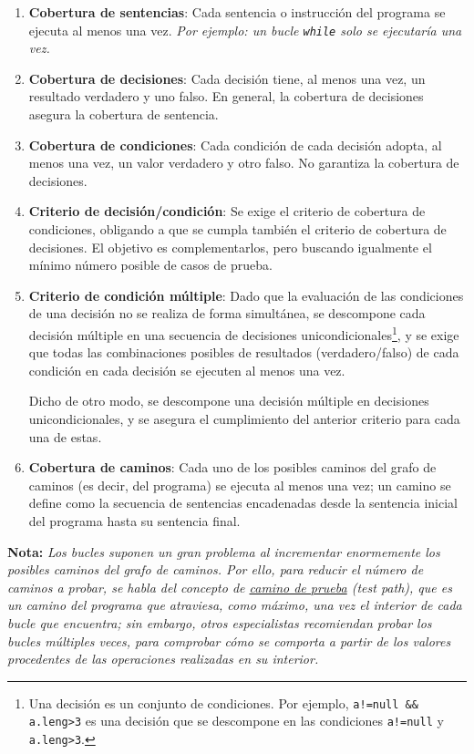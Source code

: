 \begin{enumerate}
    \item \textbf{Cobertura de sentencias}: Cada sentencia o instrucción del programa se ejecuta al menos una vez. \textit{Por ejemplo: un bucle \texttt{while} solo se ejecutaría una vez.}

    \item \textbf{Cobertura de decisiones}: Cada decisión tiene, al menos una vez, un resultado verdadero y uno falso. En general, la cobertura de decisiones asegura la cobertura de sentencia.

    \item \textbf{Cobertura de condiciones}: Cada condición de cada decisión adopta, al menos una vez, un valor verdadero y otro falso. No garantiza la cobertura de decisiones.

    \item \textbf{Criterio de decisión/condición}: Se exige el criterio de cobertura de condiciones, obligando a que se cumpla también el criterio de cobertura de decisiones. El objetivo es complementarlos, pero buscando igualmente el mínimo número posible de casos de prueba.

    \item \textbf{Criterio de condición múltiple}: Dado que la evaluación de las condiciones de una decisión no se realiza de forma simultánea, se descompone cada decisión múltiple en una secuencia de decisiones unicondicionales\footnote{Una decisión es un conjunto de condiciones. Por ejemplo,
              \texttt{a!=null \&\& a.leng>3} es una decisión que se descompone en las condiciones \texttt{a!=null} y \texttt{a.leng>3}.}, y se exige que todas las combinaciones posibles de resultados (verdadero/falso) de cada condición en cada decisión se ejecuten al menos una vez.

              Dicho de otro modo, se descompone una decisión múltiple en decisiones unicondicionales, y se asegura el cumplimiento del anterior criterio para cada una de estas.

    \item \textbf{Cobertura de caminos}: Cada uno de los posibles caminos del grafo de caminos (es decir, del programa) se ejecuta al menos una vez; un camino se define como la secuencia de sentencias encadenadas desde la sentencia inicial del programa hasta su sentencia final.
\end{enumerate}

\textbf{Nota:} \textit{Los bucles suponen un gran problema al incrementar enormemente los posibles caminos del grafo de caminos. Por ello, para reducir el número de caminos a probar, se habla del concepto de \uline{camino de prueba} (test path), que es un camino del programa que atraviesa, como máximo, una vez el interior de cada bucle que encuentra; sin embargo, otros especialistas recomiendan probar los bucles múltiples veces, para comprobar cómo se comporta a partir de los valores procedentes de las operaciones realizadas en su interior.}

